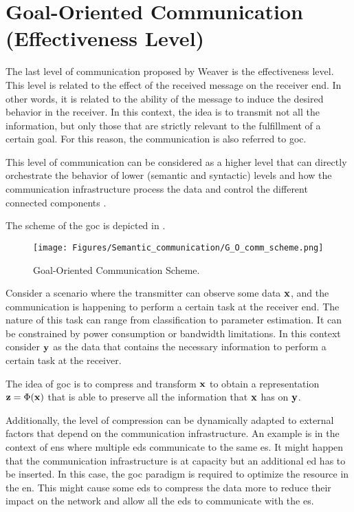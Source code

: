 \section{Goal-Oriented Communication (Effectiveness Level)} \label{sec: SEMCOM go}
The last level of communication proposed by Weaver is the effectiveness level. This level is related to the effect of the received message on the receiver end. In other words, it is related to the ability of the message to induce the desired behavior in the receiver. In this context, the idea is to transmit not all the information, but only those that are strictly relevant to the fulfillment of a certain goal. For this reason, the communication is also referred to \gls{goc}.

This level of communication can be considered as a higher level that can directly orchestrate the behavior of lower (semantic and syntactic) levels and how the communication infrastructure process the data and control the different connected components \cite{Zhang2022goaloriented, Kountouris2024goal}.

The scheme of the \gls{goc} is depicted in .

\begin{figure}
    \centering
    \texttt{[image: Figures/Semantic\_communication/G\_O\_comm\_scheme.png]}
    \caption[Goal-Oriented Communication Scheme]{Goal-Oriented Communication Scheme.}
    \label{fig: SEMCOM go_comm_scheme}
\end{figure}

Consider a scenario where the transmitter can observe some data $\mathbf{x}$, and the communication is happening to perform a certain task at the receiver end. The nature of this task can range from classification to parameter estimation. It can be constrained by power consumption or bandwidth limitations. In this context consider $\mathbf{y}$ as the data that contains the necessary information to perform a certain task at the receiver.

The idea of \gls{goc} is to compress and transform $\mathbf{x}$ to obtain a representation $\mathbf{z}=\Phi(\mathbf{x})$ that is able to preserve all the information that $\mathbf{x}$ has on $\mathbf{y}$.

Additionally, the level of compression can be dynamically adapted to external factors that depend on the communication infrastructure. An example is in the context of \glspl{en} where multiple \glspl{ed} communicate to the same \gls{es}. It might happen that the communication infrastructure is at capacity but an additional \gls{ed} has to be inserted. In this case, the \gls{goc} paradigm is required to optimize the resource in the \gls{en}. This might cause some \glspl{ed} to compress the data more to reduce their impact on the network and allow all the \glspl{ed} to communicate with the \gls{es}.

